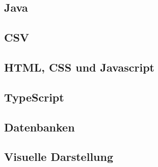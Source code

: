 

\begin{spacing}{1}
    \section{Java}\label{section:allTechJava}
    \end{spacing}


\begin{spacing}{1}
    \section{CSV}\label{section:allTechCSV}
    \end{spacing}


\begin{spacing}{1}
    \section{HTML, CSS und Javascript}\label{section:allTechHTMLCSS}
    \end{spacing}

 
\begin{spacing}{1}
    \section{TypeScript}\label{section:allTechTypescript}
    \end{spacing}

 
\begin{spacing}{1}
    \section{Datenbanken}\label{section:database}
    \end{spacing}


\begin{spacing}{1}
    \section{Visuelle Darstellung}\label{section:gui}
    \end{spacing}


